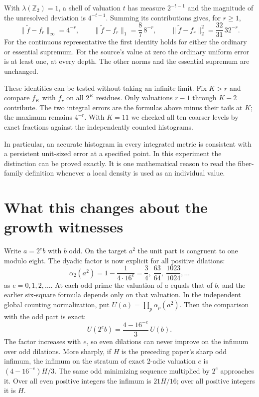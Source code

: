 \documentclass[12pt,letterpaper]{article}
\begin{document}
With \(\lambda(\mathbb Z_2)=1\), a shell of valuation \(t\) has measure \(2^{-t-1}\) and the magnitude of the unresolved deviation is \(4^{-t-1}\). Summing its contributions gives, for \(r\ge1\),
\[
 \|\widetilde f-f_r\|_\infty=4^{-r},\qquad
 \|\widetilde f-f_r\|_1=\frac87\,8^{-r},\qquad
 \|\widetilde f-f_r\|_2^2=\frac{32}{31}\,32^{-r}.
\]
For the continuous representative the first identity holds for either the ordinary or essential supremum. For the source's value at zero the ordinary uniform error is at least one, at every depth. The other norms and the essential supremum are unchanged.

These identities can be tested without taking an infinite limit. Fix \(K>r\) and compare \(f_K\) with \(f_r\) on all \(2^K\) residues. Only valuations \(r-1\) through \(K-2\) contribute. The two integral errors are the formulas above minus their tails at \(K\); the maximum remains \(4^{-r}\). With \(K=11\) we checked all ten coarser levels by exact fractions against the independently counted histograms.

In particular, an accurate histogram in every integrated metric is consistent with a persistent unit-sized error at a specified point. In this experiment the distinction can be proved exactly. It is one mathematical reason to read the fiber-family definition whenever a local density is used as an individual value.

\clearpage\section{What this changes about the growth witnesses}
Write \(a=2^e b\) with \(b\) odd. On the target \(a^2\) the unit part is congruent to one modulo eight. The dyadic factor is now explicit for all positive dilations:
\[
       \alpha_2(a^2)=1-\frac{1}{4\cdot16^e}
         =\frac34,\ \frac{63}{64},\ \frac{1023}{1024},\ldots
\]
as \(e=0,1,2,\ldots\). At each odd prime the valuation of \(a\) equals that of \(b\), and the earlier six-square formula depends only on that valuation. In the independent global counting normalization, put \(U(a)=\prod_p\alpha_p(a^2)\). Then the comparison with the odd part is exact:
\[
     U(2^eb)=\frac{4-16^{-e}}{3}\,U(b).
\]
The factor increases with \(e\), so even dilations can never improve on the infimum over odd dilations. More sharply, if \(H\) is the preceding paper's sharp odd infimum, the infimum on the stratum of exact 2-adic valuation \(e\) is \((4-16^{-e})H/3\). The same odd minimizing sequence multiplied by \(2^e\) approaches it. Over all even positive integers the infimum is \(21H/16\); over all positive integers it is \(H\).
\end{document}
